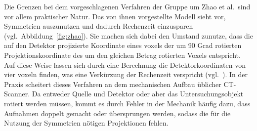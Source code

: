 Die Grenzen bei dem vorgeschlagenen Verfahren der Gruppe um Zhao et al.\ sind vor allem praktischer Natur. Das von ihnen
vorgestellte Modell sieht vor, Symmetrien auszunutzen und dadurch Rechenzeit einzusparen (vgl.\
Abbildung~\ref{fig:zhao}). Sie machen sich dabei den Umstand zunutze, dass die auf den Detektor projizierte Koordinate
eines \gls{voxel}s der um 90 Grad rotierten Projektionskoordinate des um den gleichen Betrag rotierten Voxels
entspricht. Auf diese Weise lassen sich durch eine Berechnung die Detektorkoordinaten von vier \gls{voxel}n finden, was
eine Verkürzung der Rechenzeit verspricht (vgl.~\cite{zhao}). In der Praxis scheitert dieses Verfahren an dem
mechanischen Aufbau üblicher CT-Scanner. Da entweder Quelle und Detektor oder aber das Untersuchungsobjekt rotiert
werden müssen, kommt es durch Fehler in der Mechanik häufig dazu, dass Aufnahmen doppelt gemacht oder übersprungen
werden, sodass die für die Nutzung der Symmetrien nötigen Projektionen fehlen.


